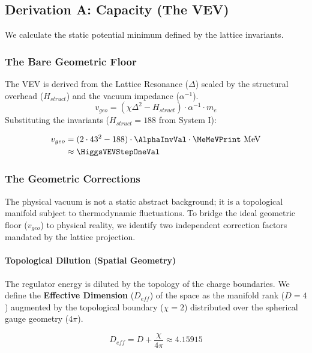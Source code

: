 \subsection{Derivation A: Capacity (The VEV)}
We calculate the static potential minimum defined by the lattice invariants.

\subsubsection{The Bare Geometric Floor}
The VEV is derived from the Lattice Resonance ($\Delta$) scaled by the structural overhead ($H_{struct}$) and the vacuum impedance ($\alpha^{-1}$).
\begin{equation}
v_{geo} = (\chi \Delta^2 - H_{struct}) \cdot \alpha^{-1} \cdot m_e 
\end{equation}
Substituting the invariants ($H_{struct} = 188$ from System I):

\begin{equation}
\begin{split}
v_{geo} &= (2 \cdot 43^2 - 188) \cdot \AlphaInvVal \cdot \MeMeVPrint \text{ MeV} \\
&\approx \HiggsVEVStepOneVal
\end{split}
\end{equation}

\subsubsection{The Geometric Corrections}
The physical vacuum is not a static abstract background; it is a topological manifold subject to thermodynamic fluctuations. To bridge the ideal geometric floor ($v_{geo}$) to physical reality, we identify two independent correction factors mandated by the lattice projection.

\paragraph{Topological Dilution (Spatial Geometry)}
The regulator energy is diluted by the topology of the charge boundaries. We define the \textbf{Effective Dimension} ($D_{eff}$) of the space as the manifold rank ($D=4$) augmented by the topological boundary ($\chi=2$) distributed over the spherical gauge geometry ($4\pi$).

\begin{equation}
D_{eff} = D + \frac{\chi}{4\pi} \approx 4.15915
\end{equation}

